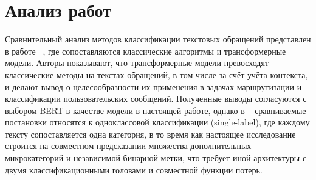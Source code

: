 \documentclass{misisarticle}
\begin{document}
\section{Анализ работ}
Сравнительный анализ методов классификации текстовых обращений представлен в работе ~\cite{nikulin}, где сопоставляются классические алгоритмы и трансформерные модели. Авторы показывают, что трансформерные модели превосходят классические методы на текстах обращений, в том числе за счёт учёта контекста, и делают вывод о целесообразности их применения в задачах маршрутизации и классификации пользовательских сообщений. Полученные выводы согласуются с выбором BERT в качестве модели в настоящей работе, однако в ~\cite{nikulin} сравниваемые постановки относятся к одноклассовой классификации (single-label), где каждому тексту сопоставляется одна категория, в то время как настоящее исследование строится на совместном предсказании множества дополнительных микрокатегорий и независимой бинарной метки, что требует иной архитектуры с двумя классификационными головами и совместной функции потерь.
\end{document}
